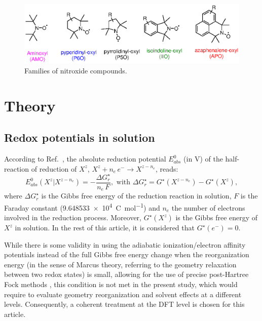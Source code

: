 \documentclass[review,preprint]{elsarticle}
\begin{document}
\begin{figure}[!h]
	\centering
	\includegraphics[width=\linewidth]{Figure2}
	\caption{Families of nitroxide compounds.}
	\label{fig:families}
\end{figure}

\section{Theory }\label{sec:theory}

\subsection{Redox potentials in solution}

According to Ref.~\cite{marenichComputationalElectrochemistryPrediction2014}, the absolute reduction potential $E_{abs}^0$ (in \si{\volt}) of the half-reaction of reduction of $X^z$, $X^{z} + n_e\,e^- \rightarrow X^{z-n_e}$, reads: \begin{equation}
	E_{abs}^0(X^{z}|X^{z-n_e}) = -\frac{\Delta G_{r}^\star}{n_e\,F}, \text{ with } \Delta G_{r}^\star = G^\star(X^{z-n_e}) - G^\star(X^z), \label{eq:nernst}
\end{equation}
where $\Delta G_{r}^\star$ is the Gibbs free energy of the reduction reaction in solution, $F$ is the Faraday constant (\SI{9.648533e4}{\coulomb\per\mole}) and $n_e$ the number of electrons involved in the reduction process. Moreover, $G^\star(X^z)$ is the Gibbs free energy of $X^z$ in solution.  In the rest of this article, it is considered that $G^\star(e^-) = 0$.

While there is some validity in using the adiabatic ionization/electron affinity potentials instead of the full Gibbs free energy change when the reorganization energy (in the sense of Marcus theory, referring to the geometry relaxation between two redox states) is small, allowing for the use of precise post-Hartree Fock methods  \cite{namazianBenchmarkCalculationsAbsolute2010,marenichComputationalElectrochemistryPrediction2014,makosModelingAbsoluteRedox2022}, this condition is not met in the present study, which would require to evaluate geometry reorganization and solvent effects at a different levels. Consequently, a coherent treatment at the DFT level is chosen for this article.
\end{document}
